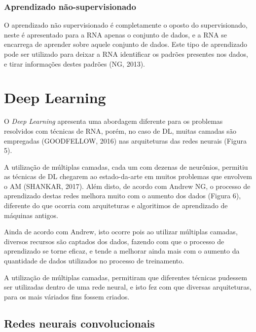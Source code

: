 \subsubsection{Aprendizado não-supervisionado}

O aprendizado não supervisionado é completamente o oposto do supervisionado, neste é apresentado para a RNA apenas o conjunto de dados, e a RNA se encarrega de aprender sobre aquele conjunto de dados. Este tipo de aprendizado pode ser utilizado para deixar a RNA identificar os padrões presentes nos dados, e tirar informações destes padrões (NG, 2013). 

\section{Deep Learning}

O \textit{Deep Learning} apresenta uma abordagem diferente para os problemas resolvidos com técnicas de RNA, porém, no caso de DL, muitas camadas são empregadas (GOODFELLOW, 2016) nas arquiteturas das redes neurais (Figura 5).


A utilização de múltiplas camadas, cada um com dezenas de neurônios, permitiu as técnicas de DL chegarem ao estado-da-arte em muitos problemas que envolvem o AM (SHANKAR, 2017).  Além disto, de acordo com Andrew NG, o processo de aprendizado destas redes melhora muito com o aumento dos dados (Figura 6), diferente do que ocorria com arquiteturas e algoritimos de aprendizado de máquinas antigos.


Ainda de acordo com Andrew, isto ocorre pois ao utilizar múltiplas camadas, diversos recursos são captados dos dados, fazendo com que o processo de aprendizado se torne eficaz, e tende a melhorar ainda mais com o aumento da quantidade de dados utilizados no processo de treinamento. 

A utilização de múltiplas camadas, permitiram que diferentes técnicas pudessem ser utilizadas dentro de uma rede neural, e isto fez com que diversas arquiteturas, para os mais váriados fins fossem criados.

\subsection{Redes neurais convolucionais}

